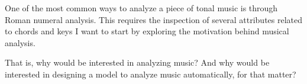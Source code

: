

One of the most common ways to analyze a piece of tonal
music is through Roman numeral analysis. This requires the
inspection of several attributes related to chords and keys I want to start by exploring the motivation behind musical analysis.

That is, why would be interested in analyzing music? And why would be interested in designing a model to analyze music automatically, for that matter?
